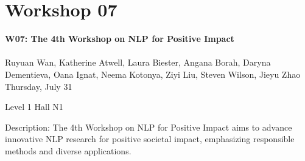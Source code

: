 \clearpage


\section[W07: The 4th Workshop on NLP for Positive Impact]{Workshop 07}
\label{workshop_7}

\begin{center}
    {\Large \textbf{W07: The 4th Workshop on NLP for Positive Impact}}\\
\\

    Ruyuan Wan, Katherine Atwell, Laura Biester, Angana Borah, Daryna Dementieva, Oana Ignat, Neema Kotonya, Ziyi Liu, Steven Wilson, Jieyu Zhao\\

   Thursday, July 31
    
    Level 1 Hall N1

\end{center}

Description: The 4th Workshop on NLP for Positive Impact aims to advance innovative NLP research for positive societal impact, emphasizing responsible methods and diverse applications.

